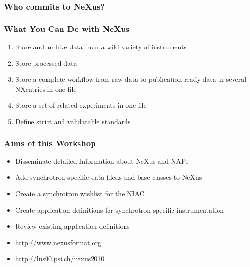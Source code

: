\documentclass{beamer}
\begin{document}
\begin{frame} \frametitle{Who commits to NeXus? }
\begin{figure}[!ht]
\end{figure}
\end{frame}

\begin{frame} \frametitle{What You Can Do with NeXus}
\begin{enumerate}
\item Store and archive data from a wild variety of instruments
\item Store processed data
\item Store a complete workflow from raw data to publication ready data in several 
 NXentries in one file
\item Store a set of related experiments in one file
\item Define strict and validatable standards 
\end{enumerate}
\end{frame}

\begin{frame} \frametitle{Aims of this Workshop }
\begin{itemize}
\item Disseminate detailed Information about NeXus and NAPI
\item Add synchrotron specific data fileds and base classes to NeXus
\item Create a synchrotron wishlist for the NIAC
\item Create application definitions for synchrotron specific instrumentation
\item Review existing application definitions 
\item http://www.nexusformat.org
\item http://lns00.psi.ch/nexus2010
\end{itemize}
\end{frame}
\end{document}
